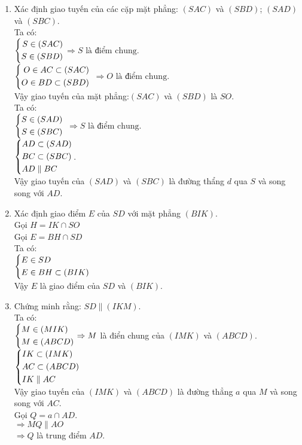 \begin{bt}
{\begin{center}
\end{center}
\begin{enumerate}
\item Xác định giao tuyến của các cặp mặt phẳng: $(SAC)$ và $(SBD)$; $(SAD)$ và $(SBC)$.\\
Ta có:\\ $\left\{\begin{aligned}S \in (SAC)\\ S \in (SBD)\end{aligned}\right.$$
$$\Rightarrow S \text{ là điểm chung}$.\\
$\left\{\begin{aligned}O \in AC \subset (SAC)\\ O \in BD \subset (SBD)\end{aligned}\right.$
$\Rightarrow O \text{ là điểm chung}$.\\
Vậy giao tuyến của mặt phẳng:$(SAC)$ và $(SBD)$ là $SO$.\\
Ta có:\\ $\left\{\begin{aligned}S \in (SAD)\\ S \in (SBC)\end{aligned}\right.$
$\Rightarrow S \text{ là điểm chung}$.\\
$\left\{\begin{aligned}&AD \subset (SAD)\\ &BC \subset (SBC)\\ &AD \parallel BC\end{aligned}\right.$.\\
Vậy giao tuyến của $(SAD)$ và $(SBC)$ là đường thẩng $d$ qua $S$ và song song với $AD$.
\item Xác định giao điểm $E$ của $SD$ với mặt phẳng $(BIK)$.\\
Gọi $H = IK \cap SO$\\
Gọi $E = BH \cap SD$\\
Ta có:\\ $\left\{\begin{aligned}&E \in SD \\ &E \in BH \subset(BIK)\end{aligned}\right.$\\
Vậy $E$ là giao điểm của $SD$ và $(BIK)$.
\item Chứng minh rằng: $SD \parallel (IKM)$.\\
Ta có:\\
$\left\{\begin{aligned}&M \in (MIK) \\ & M \in (ABCD)\end{aligned}\right. \Rightarrow M$ là điển chung của $(IMK)$ và $(ABCD)$.\\
$\left\{\begin{aligned}&IK \subset (IMK)\\ &AC \subset (ABCD)\\ &IK \parallel AC\end{aligned}\right.$\\
Vậy giao tuyến của $(IMK)$ và $(ABCD)$ là đường thẳng $a$ qua $M$ và song song với $AC$.\\
Gọi $Q = a \cap AD $.\\
$\Rightarrow MQ \parallel AO$\\
$\Rightarrow Q$ là trung điểm $AD$.\\

\end{enumerate}}
\end{bt}
